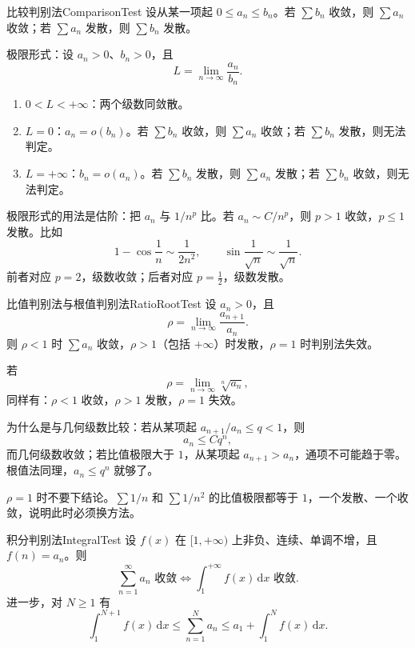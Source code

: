 \begin{conclusion}{比较判别法}{ComparisonTest}
    设从某一项起 $0\le a_n\le b_n$。若 $\sum b_n$ 收敛，则 $\sum a_n$ 收敛；若 $\sum a_n$ 发散，则 $\sum b_n$ 发散。

    极限形式：设 $a_n>0$、$b_n>0$，且
    \[
        L=\lim_{n\to\infty}\frac{a_n}{b_n}.
    \]
    \begin{enumerate}
        \item $0<L<+\infty$：两个级数同敛散。
        \item $L=0$：$a_n=o(b_n)$。若 $\sum b_n$ 收敛，则 $\sum a_n$ 收敛；若 $\sum b_n$ 发散，则无法判定。
        \item $L=+\infty$：$b_n=o(a_n)$。若 $\sum b_n$ 发散，则 $\sum a_n$ 发散；若 $\sum b_n$ 收敛，则无法判定。
    \end{enumerate}
\end{conclusion}

极限形式的用法是估阶：把 $a_n$ 与 $1/n^p$ 比。若 $a_n\sim C/n^p$，则 $p>1$ 收敛，$p\le1$ 发散。比如
\[
1-\cos\frac1n\sim\frac{1}{2n^2},
\qquad
\sin\frac1{\sqrt n}\sim\frac1{\sqrt n}.
\]
前者对应 $p=2$，级数收敛；后者对应 $p=\frac12$，级数发散。

\begin{conclusion}{比值判别法与根值判别法}{RatioRootTest}
    设 $a_n>0$，且
    \[
        \rho=\lim_{n\to\infty}\frac{a_{n+1}}{a_n}.
    \]
    则 $\rho<1$ 时 $\sum a_n$ 收敛，$\rho>1$（包括 $+\infty$）时发散，$\rho=1$ 时判别法失效。

    若
    \[
        \rho=\lim_{n\to\infty}\sqrt[n]{a_n},
    \]
    同样有：$\rho<1$ 收敛，$\rho>1$ 发散，$\rho=1$ 失效。
\end{conclusion}

为什么是与几何级数比较：若从某项起 $a_{n+1}/a_n\le q<1$，则
\[
a_n\le Cq^n,
\]
而几何级数收敛；若比值极限大于 $1$，从某项起 $a_{n+1}>a_n$，通项不可能趋于零。根值法同理，$a_n\le q^n$ 就够了。

$\rho=1$ 时不要下结论。$\sum1/n$ 和 $\sum1/n^2$ 的比值极限都等于 $1$，一个发散、一个收敛，说明此时必须换方法。

\begin{conclusion}{积分判别法}{IntegralTest}
    设 $f(x)$ 在 $[1,+\infty)$ 上非负、连续、单调不增，且 $f(n)=a_n$。则
    \[
        \sum_{n=1}^{\infty}a_n\text{ 收敛}
        \iff
        \int_1^{+\infty}f(x)\,\mathrm dx\text{ 收敛}.
    \]
    进一步，对 $N\ge1$ 有
    \[
        \int_1^{N+1}f(x)\,\mathrm dx
        \le \sum_{n=1}^{N}a_n
        \le a_1+\int_1^{N}f(x)\,\mathrm dx.
    \]
\end{conclusion}

